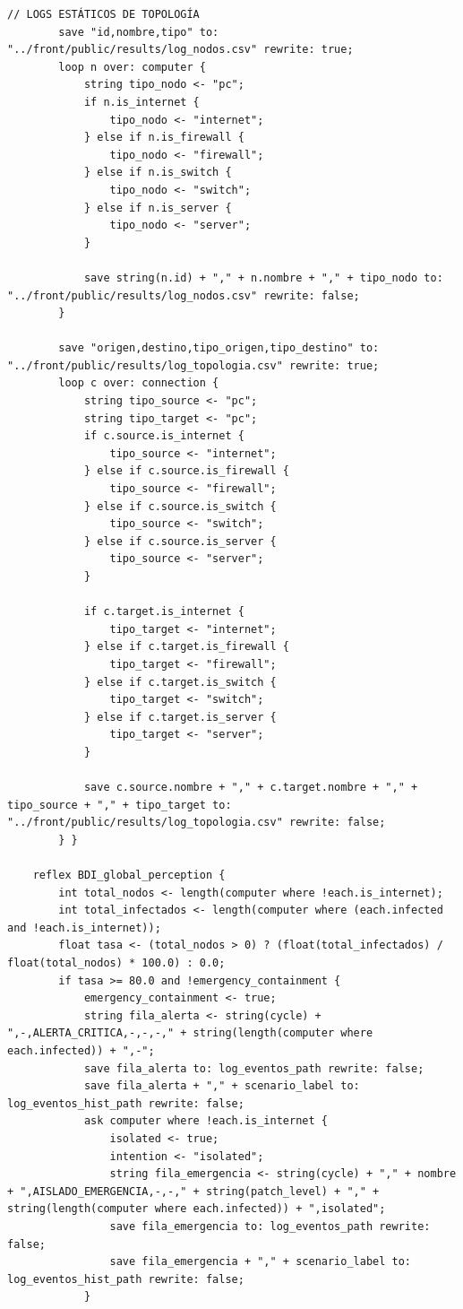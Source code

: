\begin{lstlisting}[caption={InfeccionRedes.gaml - Código fuente de la simulación en GAMA Platform}, label={list:gaml_code}]
		// LOGS ESTÁTICOS DE TOPOLOGÍA
		save "id,nombre,tipo" to: "../front/public/results/log_nodos.csv" rewrite: true;
		loop n over: computer {
			string tipo_nodo <- "pc";
			if n.is_internet {
				tipo_nodo <- "internet";
			} else if n.is_firewall {
				tipo_nodo <- "firewall";
			} else if n.is_switch {
				tipo_nodo <- "switch";
			} else if n.is_server {
				tipo_nodo <- "server";
			}

			save string(n.id) + "," + n.nombre + "," + tipo_nodo to: "../front/public/results/log_nodos.csv" rewrite: false;
		}

		save "origen,destino,tipo_origen,tipo_destino" to: "../front/public/results/log_topologia.csv" rewrite: true;
		loop c over: connection {
			string tipo_source <- "pc";
			string tipo_target <- "pc";
			if c.source.is_internet {
				tipo_source <- "internet";
			} else if c.source.is_firewall {
				tipo_source <- "firewall";
			} else if c.source.is_switch {
				tipo_source <- "switch";
			} else if c.source.is_server {
				tipo_source <- "server";
			}

			if c.target.is_internet {
				tipo_target <- "internet";
			} else if c.target.is_firewall {
				tipo_target <- "firewall";
			} else if c.target.is_switch {
				tipo_target <- "switch";
			} else if c.target.is_server {
				tipo_target <- "server";
			}

			save c.source.nombre + "," + c.target.nombre + "," + tipo_source + "," + tipo_target to: "../front/public/results/log_topologia.csv" rewrite: false;
		} }

	reflex BDI_global_perception {
		int total_nodos <- length(computer where !each.is_internet);
		int total_infectados <- length(computer where (each.infected and !each.is_internet));
		float tasa <- (total_nodos > 0) ? (float(total_infectados) / float(total_nodos) * 100.0) : 0.0;
		if tasa >= 80.0 and !emergency_containment {
			emergency_containment <- true;
			string fila_alerta <- string(cycle) + ",-,ALERTA_CRITICA,-,-,-," + string(length(computer where each.infected)) + ",-";
			save fila_alerta to: log_eventos_path rewrite: false;
			save fila_alerta + "," + scenario_label to: log_eventos_hist_path rewrite: false;
			ask computer where !each.is_internet {
				isolated <- true;
				intention <- "isolated";
				string fila_emergencia <- string(cycle) + "," + nombre + ",AISLADO_EMERGENCIA,-,-," + string(patch_level) + "," + string(length(computer where each.infected)) + ",isolated";
				save fila_emergencia to: log_eventos_path rewrite: false;
				save fila_emergencia + "," + scenario_label to: log_eventos_hist_path rewrite: false;
			}


\end{lstlisting}
